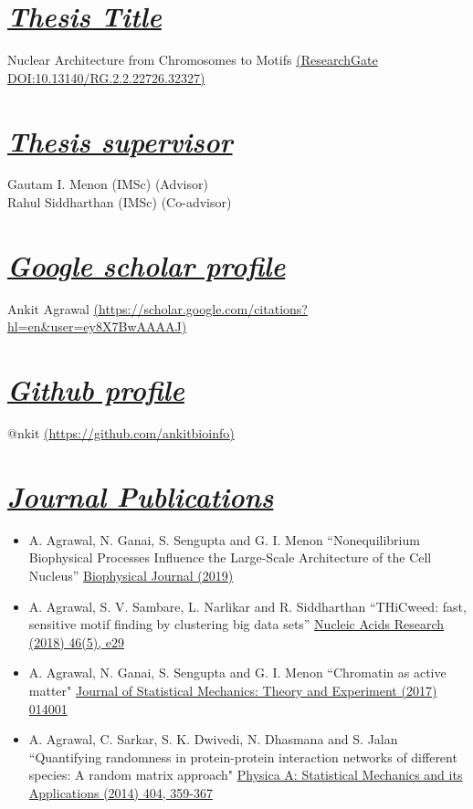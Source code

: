 \documentclass{res}
\begin{document}
\begin{resume}
\section{\sl \underline{Thesis Title}} 
Nuclear Architecture from Chromosomes to Motifs
\href{https://www.researchgate.net/publication/328801683_Nuclear_Architecture_from_Chromosomes_to_Motifs}
{(ResearchGate DOI:10.13140/RG.2.2.22726.32327)}

\section{\sl \underline{Thesis supervisor}}
Gautam I. Menon (IMSc) (Advisor) \\
Rahul Siddharthan (IMSc) (Co-advisor) 

\section{\sl \underline{Google scholar profile}}
Ankit Agrawal \href{https://scholar.google.com/citations?hl=en&user=ey8X7BwAAAAJ}
{(\url{https://scholar.google.com/citations?hl=en&user=ey8X7BwAAAAJ})}

\section{\sl \underline{Github profile}}
@nkit \href{https://github.com/ankitbioinfo}{(\url{https://github.com/ankitbioinfo})}


\section{\sl \underline{Journal Publications}}
\begin{itemize}
\item A. Agrawal, N. Ganai, S. Sengupta and G. I. Menon ``Nonequilibrium Biophysical Processes Influence the Large-Scale Architecture of the Cell Nucleus'' 
\href{https://doi.org/10.1016/j.bpj.2019.11.017}
{Biophysical Journal (2019)}
\item A. Agrawal, S. V. Sambare, L. Narlikar and R. Siddharthan ``THiCweed: fast, sensitive motif finding by clustering big data sets'' 
\href{https://academic.oup.com/nar/article/46/5/e29/4754463}
{Nucleic Acids Research (2018) 46(5), e29} 
\item A. Agrawal, N. Ganai, S. Sengupta and G. I. Menon ``Chromatin as active matter" 
\href{http://iopscience.iop.org/article/10.1088/1742-5468/aa5287}
{Journal of Statistical Mechanics: Theory and Experiment (2017) 014001}
\item A. Agrawal, C. Sarkar, S. K. Dwivedi, N. Dhasmana and S. Jalan ``Quantifying randomness in protein-protein interaction networks of different species: A random matrix approach" 
\href{https://doi.org/10.1016/j.physa.2013.12.005}
{Physica A: Statistical Mechanics and its Applications (2014) 404, 359-367}


\end{itemize}
\end{resume}
\end{document}
